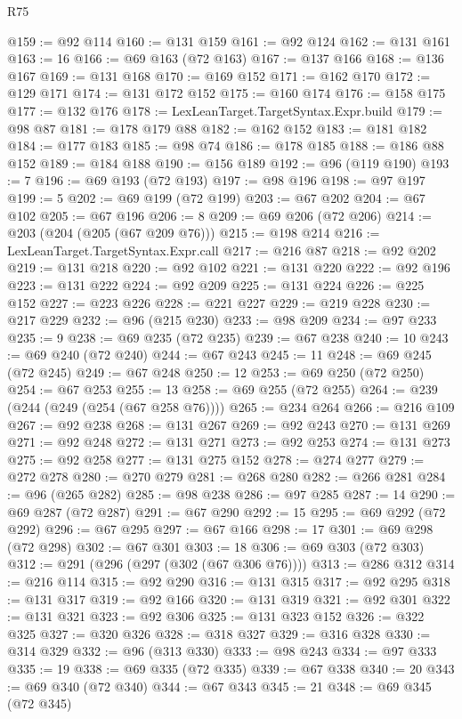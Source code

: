 \begin{lexlean}{R75}
\begin{coremodule}
@159 := @92 @114
@160 := @131 @159
@161 := @92 @124
@162 := @131 @161
@163 := 16
@166 := @69 @163 (@72 @163)
@167 := @137 @166
@168 := @136 @167
@169 := @131 @168
@170 := @169 @152
@171 := @162 @170
@172 := @129 @171
@174 := @131 @172 @152
@175 := @160 @174
@176 := @158 @175
@177 := @132 @176
@178 := LexLeanTarget.TargetSyntax.Expr.build
@179 := @98 @87
@181 := @178 @179 @88
@182 := @162 @152
@183 := @181 @182
@184 := @177 @183
@185 := @98 @74
@186 := @178 @185
@188 := @186 @88 @152
@189 := @184 @188
@190 := @156 @189
@192 := @96 (@119 @190)
@193 := 7
@196 := @69 @193 (@72 @193)
@197 := @98 @196
@198 := @97 @197
@199 := 5
@202 := @69 @199 (@72 @199)
@203 := @67 @202
@204 := @67 @102
@205 := @67 @196
@206 := 8
@209 := @69 @206 (@72 @206)
@214 := @203 (@204 (@205 (@67 @209 @76)))
@215 := @198 @214
@216 := LexLeanTarget.TargetSyntax.Expr.call
@217 := @216 @87
@218 := @92 @202
@219 := @131 @218
@220 := @92 @102
@221 := @131 @220
@222 := @92 @196
@223 := @131 @222
@224 := @92 @209
@225 := @131 @224
@226 := @225 @152
@227 := @223 @226
@228 := @221 @227
@229 := @219 @228
@230 := @217 @229
@232 := @96 (@215 @230)
@233 := @98 @209
@234 := @97 @233
@235 := 9
@238 := @69 @235 (@72 @235)
@239 := @67 @238
@240 := 10
@243 := @69 @240 (@72 @240)
@244 := @67 @243
@245 := 11
@248 := @69 @245 (@72 @245)
@249 := @67 @248
@250 := 12
@253 := @69 @250 (@72 @250)
@254 := @67 @253
@255 := 13
@258 := @69 @255 (@72 @255)
@264 := @239 (@244 (@249 (@254 (@67 @258 @76))))
@265 := @234 @264
@266 := @216 @109
@267 := @92 @238
@268 := @131 @267
@269 := @92 @243
@270 := @131 @269
@271 := @92 @248
@272 := @131 @271
@273 := @92 @253
@274 := @131 @273
@275 := @92 @258
@277 := @131 @275 @152
@278 := @274 @277
@279 := @272 @278
@280 := @270 @279
@281 := @268 @280
@282 := @266 @281
@284 := @96 (@265 @282)
@285 := @98 @238
@286 := @97 @285
@287 := 14
@290 := @69 @287 (@72 @287)
@291 := @67 @290
@292 := 15
@295 := @69 @292 (@72 @292)
@296 := @67 @295
@297 := @67 @166
@298 := 17
@301 := @69 @298 (@72 @298)
@302 := @67 @301
@303 := 18
@306 := @69 @303 (@72 @303)
@312 := @291 (@296 (@297 (@302 (@67 @306 @76))))
@313 := @286 @312
@314 := @216 @114
@315 := @92 @290
@316 := @131 @315
@317 := @92 @295
@318 := @131 @317
@319 := @92 @166
@320 := @131 @319
@321 := @92 @301
@322 := @131 @321
@323 := @92 @306
@325 := @131 @323 @152
@326 := @322 @325
@327 := @320 @326
@328 := @318 @327
@329 := @316 @328
@330 := @314 @329
@332 := @96 (@313 @330)
@333 := @98 @243
@334 := @97 @333
@335 := 19
@338 := @69 @335 (@72 @335)
@339 := @67 @338
@340 := 20
@343 := @69 @340 (@72 @340)
@344 := @67 @343
@345 := 21
@348 := @69 @345 (@72 @345)

\end{coremodule}
\end{lexlean}
